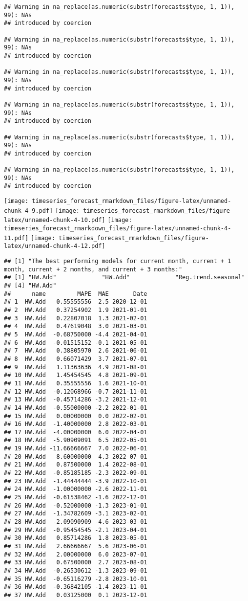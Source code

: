 \documentclass[
]{article}
\begin{document}
\begin{verbatim}
## Warning in na_replace(as.numeric(substr(forecasts$type, 1, 1)), 99): NAs
## introduced by coercion

## Warning in na_replace(as.numeric(substr(forecasts$type, 1, 1)), 99): NAs
## introduced by coercion

## Warning in na_replace(as.numeric(substr(forecasts$type, 1, 1)), 99): NAs
## introduced by coercion

## Warning in na_replace(as.numeric(substr(forecasts$type, 1, 1)), 99): NAs
## introduced by coercion

## Warning in na_replace(as.numeric(substr(forecasts$type, 1, 1)), 99): NAs
## introduced by coercion

## Warning in na_replace(as.numeric(substr(forecasts$type, 1, 1)), 99): NAs
## introduced by coercion
\end{verbatim}

\texttt{[image: timeseries\_forecast\_rmarkdown\_files/figure-latex/unnamed-chunk-4-9.pdf]}
\texttt{[image: timeseries\_forecast\_rmarkdown\_files/figure-latex/unnamed-chunk-4-10.pdf]}
\texttt{[image: timeseries\_forecast\_rmarkdown\_files/figure-latex/unnamed-chunk-4-11.pdf]}
\texttt{[image: timeseries\_forecast\_rmarkdown\_files/figure-latex/unnamed-chunk-4-12.pdf]}

\begin{verbatim}
## [1] "The best performing models for current month, current + 1 month, current + 2 months, and current + 3 months:"
## [1] "HW.Add"             "HW.Add"             "Reg.trend.seasonal"
## [4] "HW.Add"            
##      name         MAPE  MAE       Date
## 1  HW.Add   0.55555556  2.5 2020-12-01
## 2  HW.Add   0.37254902  1.9 2021-01-01
## 3  HW.Add   0.22807018  1.3 2021-02-01
## 4  HW.Add   0.47619048  3.0 2021-03-01
## 5  HW.Add  -0.68750000 -4.4 2021-04-01
## 6  HW.Add  -0.01515152 -0.1 2021-05-01
## 7  HW.Add   0.38805970  2.6 2021-06-01
## 8  HW.Add   0.66071429  3.7 2021-07-01
## 9  HW.Add   1.11363636  4.9 2021-08-01
## 10 HW.Add   1.45454545  4.8 2021-09-01
## 11 HW.Add   0.35555556  1.6 2021-10-01
## 12 HW.Add  -0.12068966 -0.7 2021-11-01
## 13 HW.Add  -0.45714286 -3.2 2021-12-01
## 14 HW.Add  -0.55000000 -2.2 2022-01-01
## 15 HW.Add   0.00000000  0.0 2022-02-01
## 16 HW.Add  -1.40000000  2.8 2022-03-01
## 17 HW.Add  -4.00000000  6.0 2022-04-01
## 18 HW.Add  -5.90909091  6.5 2022-05-01
## 19 HW.Add -11.66666667  7.0 2022-06-01
## 20 HW.Add   8.60000000  4.3 2022-07-01
## 21 HW.Add   0.87500000  1.4 2022-08-01
## 22 HW.Add  -0.85185185 -2.3 2022-09-01
## 23 HW.Add  -1.44444444 -3.9 2022-10-01
## 24 HW.Add  -1.00000000 -2.6 2022-11-01
## 25 HW.Add  -0.61538462 -1.6 2022-12-01
## 26 HW.Add  -0.52000000 -1.3 2023-01-01
## 27 HW.Add  -1.34782609 -3.1 2023-02-01
## 28 HW.Add  -2.09090909 -4.6 2023-03-01
## 29 HW.Add  -0.95454545 -2.1 2023-04-01
## 30 HW.Add   0.85714286  1.8 2023-05-01
## 31 HW.Add   2.66666667  5.6 2023-06-01
## 32 HW.Add   2.00000000  6.0 2023-07-01
## 33 HW.Add   0.67500000  2.7 2023-08-01
## 34 HW.Add  -0.26530612 -1.3 2023-09-01
## 35 HW.Add  -0.65116279 -2.8 2023-10-01
## 36 HW.Add  -0.36842105 -1.4 2023-11-01
## 37 HW.Add   0.03125000  0.1 2023-12-01
\end{verbatim}
\end{document}
